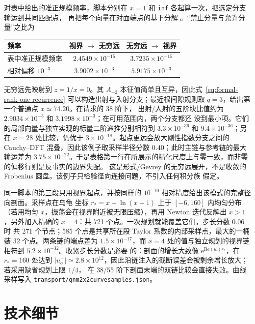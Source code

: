 \documentclass[11pt,a4paper]{ctexart}
\renewcommand{\_}{\origunderscore\allowbreak}
\begin{document}
对表中给出的准正规模频率，脚本分别在 $x=1$ 和 \texttt{inf} 各起算一次，把选定分支输运到共同匹配点，
再把每个向量在对面端点的基下分解 \cite{Leaver:1985ax,Berti:2009kk}。“禁止分量与允许分量”之比为
\begin{center}
\begin{tabular}{lcc}
\toprule
频率 & 视界 $\to$ 无穷远 & 无穷远 $\to$ 视界\\
\midrule
表中准正规模频率 & $2.4549\times10^{-15}$ & $3.7235\times10^{-15}$\\
相对偏移 $10^{-3}$ & $3.9002\times10^{-3}$ & $5.9175\times10^{-3}$\\
\bottomrule
\end{tabular}
\end{center}
无穷远先映射到 $z=1/x=0$。其 $A_{-2}$ 本征值简单且互异，因此式~\eqref{eq:formal-rank-one-recurrence}
可以构造出射与入射分支；最近根间隙规则取 $q=3$，给出第一个普通点 $x\simeq74.20$。在请求的 38 阶下，
出射/入射的五阶块比值约为 $2.9034\times10^{-3}$ 和 $3.1998\times10^{-3}$；在可用范围内，两个分支都还
没到最小项。它们的局部向量与独立实现的标量二阶递推分别相符到 $3.3\times10^{-36}$ 和
$9.4\times10^{-36}$；另在 $x=28$ 处比较，仍优于 $3\times10^{-18}$。起点更远会放大刚性指数分支之间的
Cauchy--DFT 混叠，因此该例子取采样半径分数 $0.40$；此时主链与参考链的最大输运差为
$3.75\times10^{-22}$。于是表格第一行在所展示的精化尺度上与零一致，而非零的偏移行则是反事实的边界失配。
这是形式/Gevrey 的无穷远展开，不是收敛的 Frobenius 圆盘。该例子只检验径向连接问题，不引入任何积分族
假定。

同一脚本的第三段只用视界起点，并按同样的 $10^{-10}$ 相对精度给出该模式的完整径向剖面。采样点在乌龟
坐标 $r_\ast=x+\ln(x-1)$ 上于 $[-6,160]$ 内均匀分布（若用均匀 $x$，振荡会在视界附近被无限压缩），再用
Newton 迭代反解出 $x>1$，另外加入精确的 $x=4$：共 721 个点。一次规划就能覆盖它们，步长分数 $0.06$ 时
共 271 个节点；585 个点是共享所在段 Taylor 系数的内部采样点，最大的一桶装 32 个点。两条链的端点差为
$1.5\times10^{-17}$，而 $x=4$ 处的值与独立规划的视界链相符到 $5.2\times10^{-32}$。收紧步长分数是必要
的：剖面的增长大致像 $\mathrm{e}^{\mathrm{Re}(w)r_\ast}$，在 $r_\ast=160$ 处达到
$|u^-_o|\simeq2.8\times10^{12}$，因此沿链注入的截断误差会被剩余增长放大；若采用缺省规划上限 $1/4$，
在 38/55 阶下剖面末端的双链比较会直接失败。曲线采样写入
\texttt{transport/qnm\_2x2\_curve\_samples.json}。


\section{技术细节}
\label{sec:technical-details}
\end{document}
